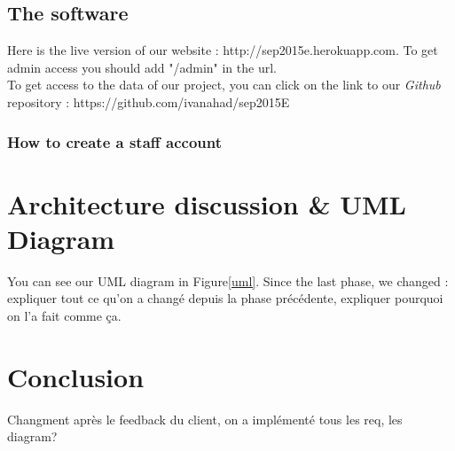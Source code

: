 \documentclass[a4paper, 12pt]{article}
\begin{document}
\subsection{The software}


Here is the live version of our website : http://sep2015e.herokuapp.com.  To get admin access you should add "/admin" in the url.\\

To get access to the data of our project, you can click on the link to our \textit{Github} repository : https://github.com/ivanahad/sep2015E\\
\subsubsection*{How to create a staff account}
 
\section{Architecture discussion \& UML Diagram}

You can see our UML diagram in Figure\ref{uml}. Since the last phase, we changed : expliquer tout ce qu'on a changé depuis la phase précédente, expliquer pourquoi on l'a fait comme ça.



\section{Conclusion}
Changment après le feedback du client, on a implémenté tous les req, les diagram? 

\begin{appendices}
\noindent

\end{appendices}
\end{document}
